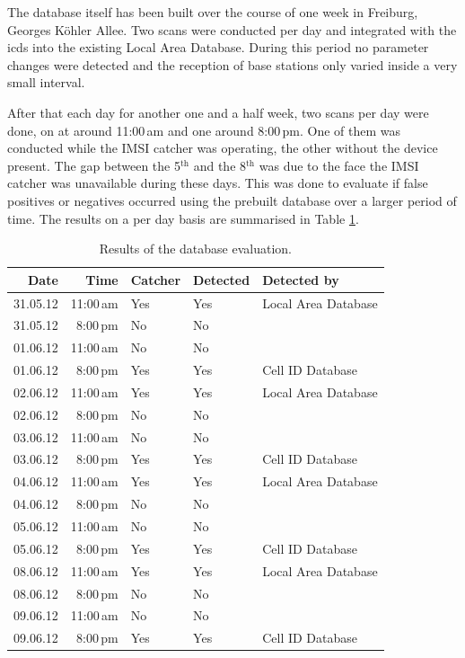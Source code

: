 The database itself has been built over the course of one week in Freiburg, Georges K\"ohler Allee.
Two scans were conducted per day and integrated with the \gls{icds} into the existing Local Area Database.
During this period no parameter changes were detected and the reception of base stations only varied inside a very small interval.

After that each day for another one and a half week, two scans per day were done, on at around 11:00\,am and one around 8:00\,pm.
One of them was conducted while the IMSI catcher was operating, the other without the device present.
The gap between the 5$^\text{th}$ and the 8$^\text{th}$ was due to the face the IMSI catcher was unavailable during these days.
This was done to evaluate if false positives or negatives occurred using the prebuilt database over a larger period of time.
The results on a per day basis are summarised in Table \ref{tab:longterm_test}.

\begin{table}
\centering
\begin{tabular}{rrlll}
\toprule
Date	&Time	&Catcher	&Detected	&Detected by\\
\midrule
31.05.12&11:00\,am	&Yes		&Yes		&Local Area Database			\\
31.05.12&8:00\,pm	&No			&No			&			\\
01.06.12&11:00\,am	&No			&No			&			\\
01.06.12&8:00\,pm	&Yes		&Yes		&Cell ID Database			\\
02.06.12&11:00\,am	&Yes		&Yes		&Local Area Database			\\
02.06.12&8:00\,pm	&No			&No			&			\\
03.06.12&11:00\,am	&No			&No			&			\\
03.06.12&8:00\,pm	&Yes		&Yes		&Cell ID Database			\\
04.06.12&11:00\,am	&Yes		&Yes		&Local Area Database			\\
04.06.12&8:00\,pm	&No			&No			&			\\
05.06.12&11:00\,am	&No			&No			&			\\
05.06.12&8:00\,pm	&Yes		&Yes		&Cell ID Database			\\
08.06.12&11:00\,am	&Yes		&Yes		&Local Area Database			\\
08.06.12&8:00\,pm	&No			&No			&			\\
09.06.12&11:00\,am&No			&No			&			\\
09.06.12&8:00\,pm	&Yes		&Yes		&Cell ID Database			\\
\bottomrule
\end{tabular}
\caption{Results of the database evaluation.}
\label{tab:longterm_test}
\end{table}

